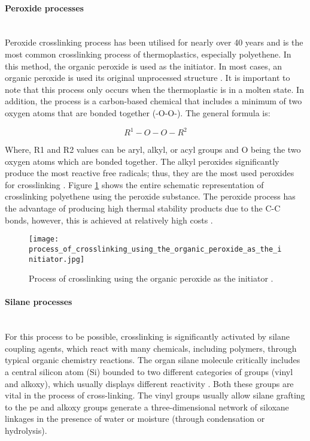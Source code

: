 \paragraph{Peroxide processes} \hfill \\
Peroxide crosslinking process has been utilised for nearly over 40 years and is the most common crosslinking process of thermoplastics, especially polyethene. In this method, the organic peroxide is used as the initiator. In most cases, an organic peroxide is used its original unprocessed structure \cite{peacock2000handbook}. It is important to note that this process only occurs when the thermoplastic is in a molten state. In addition, the process is a carbon-based chemical that includes a minimum of two oxygen atoms that are bonded together (-O-O-). The general formula is:

 \begin{equation}
    R^1-O-O-R^2
 \end{equation}

Where, R1 and R2 values can be aryl, alkyl, or acyl groups and O being the two oxygen atoms which are bonded together. The alkyl peroxides significantly produce the most reactive free radicals; thus, they are the most used peroxides for crosslinking \cite{kurtz2009cross}. Figure \ref{ch3:figure:crosslinking_process} shows the entire schematic representation of crosslinking polyethene using the peroxide substance. The peroxide process has the advantage of producing high thermal stability products due to the C-C bonds, however, this is achieved at relatively high costs \cite{patterson2022cross}.

\begin{figure}[H]
    \centering
    \texttt{[image: process\_of\_crosslinking\_using\_the\_organic\_peroxide\_as\_the\_initiator.jpg]}
    \caption{Process of crosslinking using the organic peroxide as the initiator \cite{peacock2000handbook}. }
    \label{ch3:figure:crosslinking_process}
\end{figure}

\paragraph{Silane processes} \hfill \\
For this process to be possible, crosslinking is significantly activated by silane coupling agents, which react with many chemicals, including polymers, through typical organic chemistry reactions. The organ silane molecule critically includes a central silicon atom (Si) bounded to two different categories of groups (vinyl and alkoxy), which usually displays different reactivity \cite{kurtz2009cross}. Both these groups are vital in the process of cross-linking. The vinyl groups usually allow silane grafting to the \acrshort{pe} and alkoxy groups generate a three-dimensional network of siloxane linkages in the presence of water or moisture (through condensation or hydrolysis).

